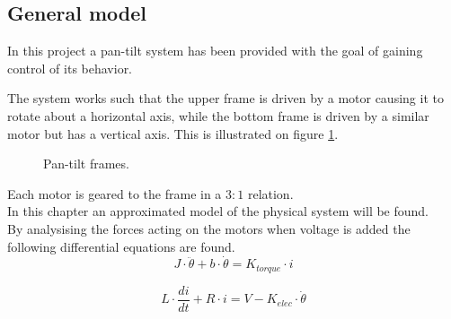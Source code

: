 \documentclass[../../main]{subfiles}
\begin{document}
\subsection{General model}
\label{ch:General_model}

In this project a pan-tilt system has been provided with the goal of gaining control of its behavior.


The system works such that the upper frame is driven by a motor causing it to rotate about a horizontal axis, while the bottom frame is driven by a similar motor but has a vertical axis. This is illustrated on figure \ref{fig:pan-tilt_frames}.

  \begin{figure}[h]
    \centering
  \def\svgwidth{0.4\columnwidth}
  \qquad
  \def\svgwidth{0.2\columnwidth}
  \caption{Pan-tilt frames.}
  \label{fig:pan-tilt_frames}
  \end{figure}

Each motor is geared to the frame in a $3:1$ relation.\\

In this chapter an approximated model of the physical system will be found.\\

By analysising the forces acting on the motors when voltage is added the following differential equations are found.\\

\begin{equation}
  \label{equ:model_mech_equ}
  J\cdot \ddot \theta + b\cdot \dot \theta = K_{torque}\cdot i
\end{equation}

\begin{equation}
  \label{equ:model_ele_equ}
  L\cdot \frac{di}{dt} + R\cdot i = V - K_{elec}\cdot \dot \theta
\end{equation}
\end{document}
